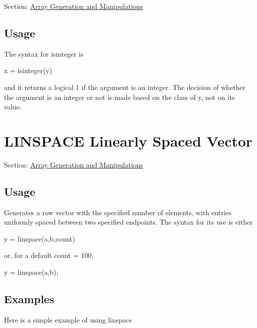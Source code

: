 Section\-: \hyperlink{sec_array}{Array Generation and Manipulations} \hypertarget{vtkwidgets_vtkxyplotwidget_Usage}{}\subsection{Usage}\label{vtkwidgets_vtkxyplotwidget_Usage}
The syntax for {\ttfamily isinteger} is \begin{DoxyVerb}  x = isinteger(y)
\end{DoxyVerb}
 and it returns a logical 1 if the argument is an integer. The decision of whether the argument is an integer or not is made based on the class of {\ttfamily y}, not on its value. \hypertarget{array_linspace}{}\section{L\-I\-N\-S\-P\-A\-C\-E Linearly Spaced Vector}\label{array_linspace}
Section\-: \hyperlink{sec_array}{Array Generation and Manipulations} \hypertarget{vtkwidgets_vtkxyplotwidget_Usage}{}\subsection{Usage}\label{vtkwidgets_vtkxyplotwidget_Usage}
Generates a row vector with the specified number of elements, with entries uniformly spaced between two specified endpoints. The syntax for its use is either \begin{DoxyVerb}   y = linspace(a,b,count)
\end{DoxyVerb}
 or, for a default {\ttfamily count = 100}, \begin{DoxyVerb}   y = linspace(a,b);
\end{DoxyVerb}
 \hypertarget{variables_matrix_Examples}{}\subsection{Examples}\label{variables_matrix_Examples}
Here is a simple example of using {\ttfamily linspace}


